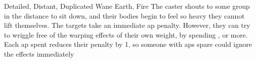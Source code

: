   {Detailed, Distant, Duplicated}%
  {Wane}%
  {Earth, Fire}%
  {}%
  {
    The caster shouts to some group in the distance to sit down, and their bodies begin to feel so heavy they cannot lift themselves.
    The targets take an immediate  \gls{ap} penalty.
    However, they can try to wriggle free of the warping effects of their own weight, by spending , or more.
    Each \gls{ap} spent reduces their penalty by 1, so someone with  \glspl{ap} spare could ignore the effects immediately}%
  {}

